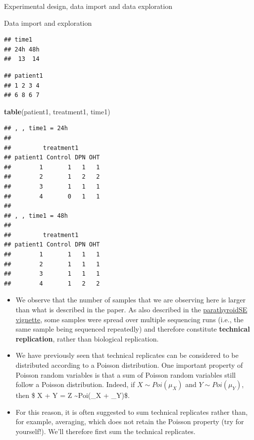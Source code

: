 \documentclass[ignorenonframetext,]{beamer}
\newenvironment{Shaded}{\begin{snugshade}}{\end{snugshade}}
\newcommand{\CommentTok}[1]{\textcolor[rgb]{0.56,0.35,0.01}{\textit{#1}}}
\newcommand{\KeywordTok}[1]{\textcolor[rgb]{0.13,0.29,0.53}{\textbf{#1}}}
\newcommand{\NormalTok}[1]{#1}
\newcommand{\OperatorTok}[1]{\textcolor[rgb]{0.81,0.36,0.00}{\textbf{#1}}}
\newcommand{\StringTok}[1]{\textcolor[rgb]{0.31,0.60,0.02}{#1}}
\providecommand{\tightlist}{%
  \setlength{\itemsep}{0pt}\setlength{\parskip}{0pt}}
\begin{document}
\begin{frame}[fragile]{Experimental design, data import and data
exploration}
\begin{block}{Data import and exploration}
\begin{verbatim}
## time1
## 24h 48h 
##  13  14
\end{verbatim}

\begin{Shaded}
\end{Shaded}

\begin{verbatim}
## patient1
## 1 2 3 4 
## 6 8 6 7
\end{verbatim}

\begin{Shaded}
\begin{Highlighting}[]
\KeywordTok{table}\NormalTok{(patient1, treatment1, time1)}
\end{Highlighting}
\end{Shaded}

\begin{verbatim}
## , , time1 = 24h
## 
##         treatment1
## patient1 Control DPN OHT
##        1       1   1   1
##        2       1   2   2
##        3       1   1   1
##        4       0   1   1
## 
## , , time1 = 48h
## 
##         treatment1
## patient1 Control DPN OHT
##        1       1   1   1
##        2       1   1   1
##        3       1   1   1
##        4       1   2   2
\end{verbatim}

\begin{itemize}
\tightlist
\item
  We observe that the number of samples that we are observing here is
  larger than what is described in the paper. As also described in the
  \href{https://www.bioconductor.org/packages/release/data/experiment/vignettes/parathyroidSE/inst/doc/parathyroidSE.pdf}{parathyroidSE
  vignette}, some samples were spread over multiple sequencing runs
  (i.e., the same sample being sequenced repeatedly) and therefore
  constitute \textbf{technical replication}, rather than biological
  replication.
\item
  We have previously seen that technical replicates can be considered to
  be distributed according to a Poisson distribution. One important
  property of Poisson random variables is that a sum of Poisson random
  variables still follow a Poisson distribution. Indeed, if
  \(X \sim Poi(\mu_X)\) and \(Y \sim Poi(\mu_Y)\), then \$ X + Y = Z
  \sim Poi(\mu\_X + \mu\_Y)\$.
\item
  For this reason, it is often suggested to sum technical replicates
  rather than, for example, averaging, which does not retain the Poisson
  property (try for yourself!). We'll therefore first sum the technical
  replicates.
\end{itemize}


\end{block}
\end{frame}
\end{document}
